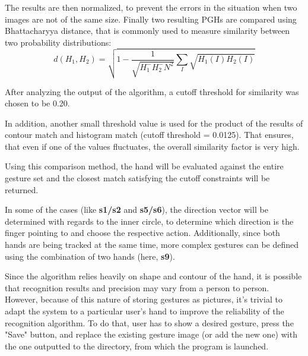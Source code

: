 \documentclass[a4paper,11pt,oneside]{article}
\begin{document}
\begin{itemize}
The results are then normalized, to prevent the errors in the situation when two images are not of the same size. Finally two resulting PGHs are compared using Bhattacharyya distance, that is commonly used to measure similarity between two probability distributions:
\[ d(H_1, H_2) = \sqrt{1- \frac{1}{ \sqrt{H_1^{-} H_2^{-} N^2}}  \sum\limits_{I} \sqrt{H_1(I) H_2(I)}} \] 

After analyzing the output of the algorithm, a cutoff threshold for similarity was chosen to be 0.20.\\

\end{itemize}

In addition, another small threshold value is used for the product of the results of contour match and histogram match (cutoff threshold = 0.0125). That ensures, that even if one of the values fluctuates, the overall similarity factor is very high.

Using this comparison method, the hand will be evaluated against the entire gesture set and the closest match satisfying the cutoff constraints will be returned.

In some of the cases (like \textbf{s1/s2} and \textbf{s5/s6}), the direction vector will be determined with regards to the inner circle, to determine which direction is the finger pointing to and choose the respective action. Additionally, since both hands are being tracked at the same time, more complex gestures can be defined using the combination of two hands (here, \textbf{s9}).

Since the algorithm relies heavily on shape and contour of the hand, it is possible that recognition results and precision may vary from a person to person. However, because of this nature of storing gestures as pictures, it's trivial to adapt the system to a particular user's hand to improve the reliability of the recognition algorithm. To do that, user has to show a desired gesture, press the "Save" button, and replace the existing gesture image (or add the new one) with the one outputted to the directory, from which the program is launched. 
\end{document}
